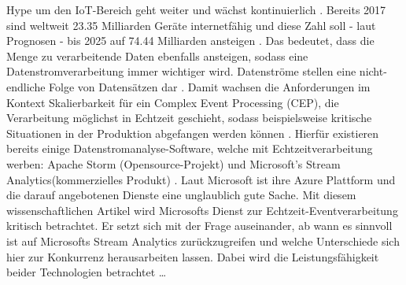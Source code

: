  Hype um den IoT-Bereich geht weiter und wächst kontinuierlich \cite{peter.2015}. Bereits 2017 sind weltweit 23.35 Milliarden Geräte internetfähig und diese Zahl soll - laut Prognosen - bis 2025 auf 74.44 Milliarden ansteigen \cite{Statista.2017}. Das bedeutet, dass die Menge zu verarbeitende Daten ebenfalls ansteigen, sodass eine Datenstromverarbeitung immer wichtiger wird. Datenströme stellen eine nicht-endliche Folge von Datensätzen dar \cite{Mock.2005}. Damit wachsen die Anforderungen im Kontext Skalierbarkeit für ein Complex Event Processing (CEP), die Verarbeitung möglichst in Echtzeit geschieht, sodass beispielsweise kritische Situationen in der Produktion abgefangen werden können \cite{rcrwireless.2016}. Hierfür existieren  bereits einige Datenstromanalyse-Software, welche mit Echtzeitverarbeitung werben: Apache Storm (Opensource-Projekt) \cite{apache.2017} und Microsoft's Stream Analytics(kommerzielles Produkt) \cite{Microsoft.2017}. Laut Microsoft ist ihre Azure Plattform und die darauf angebotenen Dienste eine unglaublich gute Sache. Mit diesem wissenschaftlichen Artikel wird Microsofts Dienst zur Echtzeit-Eventverarbeitung kritisch betrachtet. Er setzt sich mit der Frage auseinander, ab wann es sinnvoll ist auf Microsofts Stream Analytics zurückzugreifen und welche Unterschiede sich hier zur Konkurrenz herausarbeiten lassen. Dabei wird die Leistungsfähigkeit beider Technologien betrachtet …

